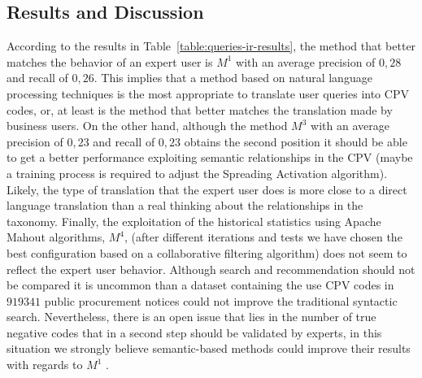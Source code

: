 \subsection{Results and Discussion}
According to the results in Table~\ref{table:queries-ir-results}, the method that better matches the behavior 
of an expert user is $M^1$ with an average precision of $0,28$ and recall of $0,26$. This implies that a method based 
on natural language processing techniques is the most appropriate to translate user queries into CPV codes, or, at least 
is the method that better matches the translation made by business users. On the other hand, although the method $M^3$ 
with an average precision of $0,23$ and recall of $0,23$ obtains the second position it should be able to get a better 
performance exploiting semantic relationships in the CPV (maybe a training process is required to adjust the Spreading Activation algorithm). Likely, 
the type of translation that the expert user does is more close to a direct language translation than a real thinking about the 
relationships in the taxonomy. Finally, the exploitation of the historical statistics using Apache Mahout algorithms, $M^{4}$, 
(after different iterations and tests we have chosen the best configuration based on a collaborative filtering algorithm) does not 
seem to reflect the expert user behavior. Although search and recommendation should not be compared it is uncommon than a dataset containing the use CPV codes in $919341$ public procurement notices could not improve the traditional syntactic 
search. Nevertheless, there is an open issue that lies in the number of true negative codes that in a second step should 
be validated by experts, in this situation we strongly believe semantic-based methods could improve their results with regards to 
$M^1$ . 

